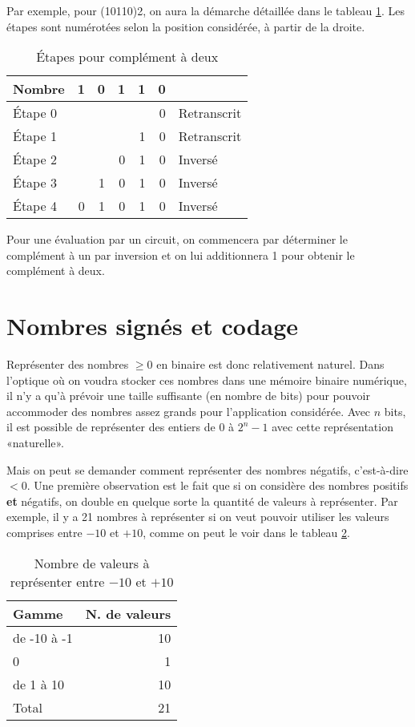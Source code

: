 \documentclass[letter, oneside]{book}
\begin{document}
\begin{enumerate}
Par exemple, pour (10110)2, on aura la démarche détaillée dans le
tableau \ref{tab:org59296d8}. Les étapes sont numérotées selon la position
considérée, à partir de la droite.

\begin{table}[htbp]
\caption{\label{tab:org59296d8}Étapes pour complément à deux}
\centering
\begin{tabular}{lrrrrrl}
Nombre & 1 & 0 & 1 & 1 & 0 & \\[0pt]
\hline
Étape 0 &  &  &  &  & 0 & Retranscrit\\[0pt]
Étape 1 &  &  &  & 1 & 0 & Retranscrit\\[0pt]
Étape 2 &  &  & 0 & 1 & 0 & Inversé\\[0pt]
Étape 3 &  & 1 & 0 & 1 & 0 & Inversé\\[0pt]
Étape 4 & 0 & 1 & 0 & 1 & 0 & Inversé\\[0pt]
\end{tabular}
\end{table}

Pour une évaluation par un circuit, on commencera par déterminer le
complément à un par inversion et on lui additionnera 1 pour obtenir le
complément à deux.
\end{enumerate}

\section{Nombres signés et codage}
\label{sec:org919db86}

Représenter des nombres \(\geq 0\) en binaire est donc relativement
naturel. Dans l'optique où on voudra stocker ces nombres dans une
mémoire binaire numérique, il n'y a qu'à prévoir une taille suffisante
(en nombre de bits) pour pouvoir accommoder des nombres assez grands
pour l'application considérée. Avec \(n\) bits, il est possible de
représenter des entiers de \(0\) à \(2^n-1\) avec cette représentation
«naturelle».

Mais on peut se demander comment représenter des nombres négatifs,
c'est-à-dire \(< 0\). Une première observation est le fait que si on
considère des nombres positifs \textbf{et} négatifs, on double en quelque
sorte la quantité de valeurs à représenter. Par exemple, il y a 21
nombres à représenter si on veut pouvoir utiliser les valeurs
comprises entre \(-10\) et \(+10\), comme on peut le voir dans le
tableau \ref{tab:orgd823f79}.

\begin{table}[htbp]
\caption{\label{tab:orgd823f79}Nombre de valeurs à représenter entre \(-10\) et \(+10\)}
\centering
\begin{tabular}{lr}
Gamme & N. de valeurs\\[0pt]
\hline
de -10 à -1 & 10\\[0pt]
0 & 1\\[0pt]
de 1 à 10 & 10\\[0pt]
\hline
Total & 21\\[0pt]
\end{tabular}
\end{table}
\end{document}
